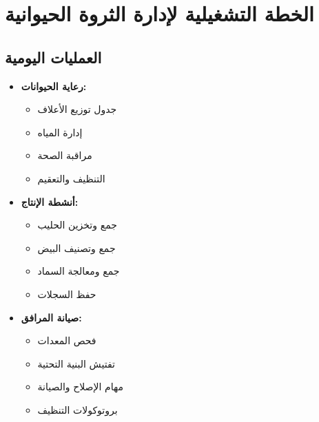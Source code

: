 \section{الخطة التشغيلية لإدارة الثروة الحيوانية}

\subsection{العمليات اليومية}
\begin{itemize}
    \item \textbf{رعاية الحيوانات:}
    \begin{itemize}
        \item جدول توزيع الأعلاف
        \item إدارة المياه
        \item مراقبة الصحة
        \item التنظيف والتعقيم
    \end{itemize}
    
    \item \textbf{أنشطة الإنتاج:}
    \begin{itemize}
        \item جمع وتخزين الحليب
        \item جمع وتصنيف البيض
        \item جمع ومعالجة السماد
        \item حفظ السجلات
    \end{itemize}
    
    \item \textbf{صيانة المرافق:}
    \begin{itemize}
        \item فحص المعدات
        \item تفتيش البنية التحتية
        \item مهام الإصلاح والصيانة
        \item بروتوكولات التنظيف
    \end{itemize}
\end{itemize}

